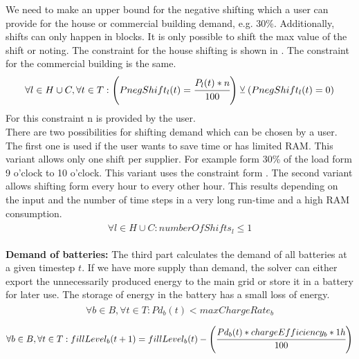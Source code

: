 We need to make an upper bound for the negative shifting which a user can provide for the house or commercial building demand, e.g. 30\%. Additionally, shifts can only happen in blocks. It is only possible to shift the max value of the shift or noting. 
The constraint for the house shifting is shown in .
The constraint for the commercial building is the same.
\begin{align} \label{eq:shiftingUpperBound}
\begin{split}
\forall l \in H\cup C, \forall t \in T: \left(PnegShift_l(t) = \cfrac{P_{l}(t) * n}{100}\right) \veebar (PnegShift_{l}(t) = 0)
\end{split}
\end{align}
For this constraint n is provided by the user.\\
There are two possibilities for shifting demand which can be chosen by a user. The first one is used if the user wants to save time or has limited RAM. This variant allows only one shift per supplier. For example form 30\% of the load form 9 o'clock to 10 o'clock. This variant uses the constraint form . The second variant allows shifting form every hour to every other hour. This results depending on the input and the number of time steps in a very long run-time and a high RAM consumption.
\begin{align} \label{eq:numberOfShifts}
\begin{split}
\forall l \in H\cup C: numberOfShifts_{l} \leq 1
\end{split}
\end{align}

\textbf{Demand of batteries:}
The third part calculates the demand of all batteries at a given timestep $t$.
If we have more supply than demand, the solver can either export the unnecessarily produced energy to the main grid or store it in a battery for later use.
The storage of energy in the battery has a small loss of energy.
\begin{align} \label{eq:limitCharge}
\begin{split}
\forall b \in B, \forall t \in T: Pd_{b}(t) < maxChargeRate_{b}
\end{split}
\end{align}
\begin{align} \label{eq:effi}
\begin{split}
\forall b \in B, \forall t \in T: fillLevel_{b}(t+1) = fillLevel_{b}(t) - \left( \cfrac{Pd_{b}(t)*chargeEfficiency_b * 1h}{100}\right)
\end{split}
\end{align}

